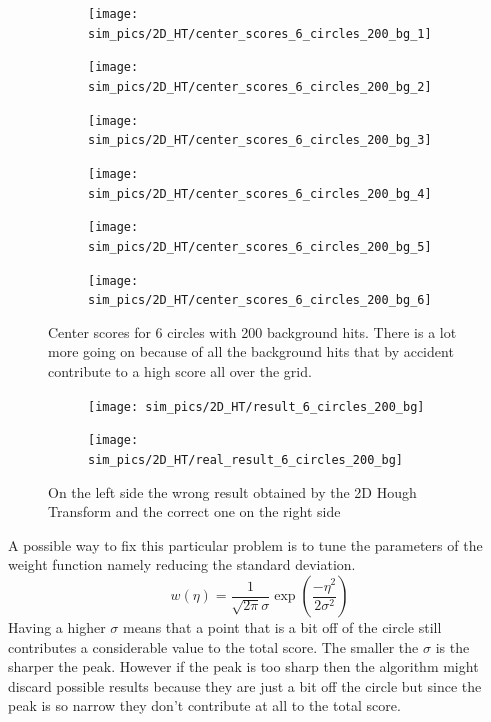 \documentclass[11pt,twoside]{scrreprt}
\begin{document}
\begin{figure}
\centering
  \begin{subfigure}{0.3\textwidth}
  \centering
    \texttt{[image: sim\_pics/2D\_HT/center\_scores\_6\_circles\_200\_bg\_1]}
  \end{subfigure}
  \begin{subfigure}{0.3\textwidth}
    \centering
    \texttt{[image: sim\_pics/2D\_HT/center\_scores\_6\_circles\_200\_bg\_2]}
  \end{subfigure}
  \begin{subfigure}{0.3\textwidth}
  \centering
    \texttt{[image: sim\_pics/2D\_HT/center\_scores\_6\_circles\_200\_bg\_3]}
  \end{subfigure}

  \begin{subfigure}{0.3\textwidth}
  \centering
    \texttt{[image: sim\_pics/2D\_HT/center\_scores\_6\_circles\_200\_bg\_4]}
  \end{subfigure}
  \begin{subfigure}{0.3\textwidth}
  \centering
    \texttt{[image: sim\_pics/2D\_HT/center\_scores\_6\_circles\_200\_bg\_5]}
  \end{subfigure}
  \begin{subfigure}{0.3\textwidth}
  \centering
    \texttt{[image: sim\_pics/2D\_HT/center\_scores\_6\_circles\_200\_bg\_6]}
  \end{subfigure}
  \caption{Center scores for 6 circles with 200 background hits. There is a lot more going on because of all the background hits that by accident contribute to a high score all over the grid.}
\end{figure}
\begin{figure}
\begin{subfigure}{0.5\textwidth}
  \texttt{[image: sim\_pics/2D\_HT/result\_6\_circles\_200\_bg]}
\end{subfigure}
\begin{subfigure}{0.5\textwidth}
  \texttt{[image: sim\_pics/2D\_HT/real\_result\_6\_circles\_200\_bg]}
\end{subfigure}
\caption{On the left side the wrong result obtained by the 2D Hough Transform and the correct one on the right side}
\end{figure}

A possible way to fix this particular problem is to tune the parameters of the weight function namely reducing the standard deviation. 
\[
  w(\eta) = \frac{1}{\sqrt{2\pi}\sigma}\exp\left( \frac{-\eta^2}{2\sigma^2}\right)
\]
Having a higher $\sigma$ means that a point that is a bit off of the circle still contributes a considerable value to the total score. The smaller the $\sigma$ is the sharper the peak. However if the peak is too sharp then the algorithm might discard possible results because they are just a bit off the circle but since the peak is so narrow they don't contribute at all to the total score.
\end{document}
